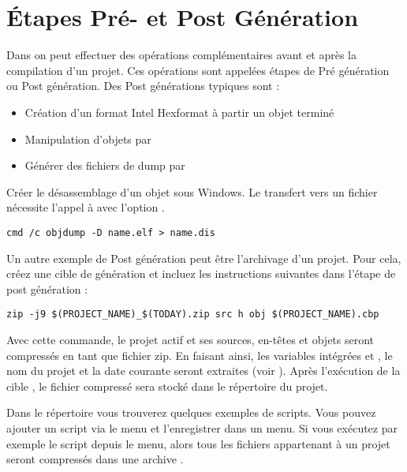 \section{Étapes Pré- et Post Génération}\label{sec:pre_postbuild}

Dans \codeblocks on peut effectuer des opérations complémentaires avant et après la compilation d'un projet. Ces opérations sont appelées étapes de Pré génération ou Post génération. Des Post générations typiques sont :

\begin{itemize}
\item Création d'un format Intel Hexformat à partir un objet terminé
\item Manipulation d'objets par 
\item Générer des fichiers de dump par 
\end{itemize}


Créer le désassemblage d'un objet sous Windows. Le transfert vers un fichier nécessite l'appel à  avec l'option .

\begin{lstlisting}
cmd /c objdump -D name.elf > name.dis
\end{lstlisting}

Un autre exemple de Post génération peut être l'archivage d'un projet. Pour cela, créez une cible de génération  et incluez les instructions suivantes dans l'étape de post génération :

\begin{lstlisting}
zip -j9 $(PROJECT_NAME)_$(TODAY).zip src h obj $(PROJECT_NAME).cbp
\end{lstlisting}

Avec cette commande, le projet actif et ses sources, en-têtes et objets seront compressés en tant que fichier zip. En faisant ainsi, les variables intégrées  et , le nom du projet et la date courante seront extraites (voir ). Après l'exécution de la cible , le fichier compressé sera stocké dans le répertoire du projet.

Dans le répertoire  vous trouverez quelques exemples de scripts. Vous pouvez ajouter un script via le menu  et l'enregistrer dans un menu. Si vous exécutez par exemple le  script  depuis le menu, alors tous les fichiers appartenant à un projet seront compressés dans une archive .

